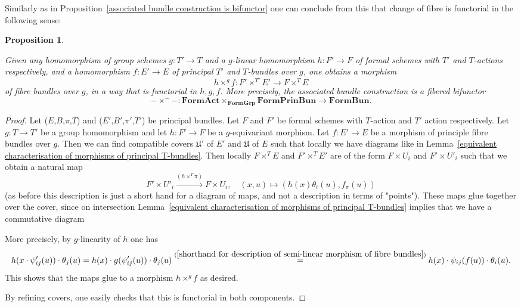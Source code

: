 \documentclass[11pt,oneside]{amsart}
\newtheorem{proposition}[theorem]{Proposition}
\theoremstyle{definition}
\theoremstyle{remark}
\begin{document}
	
	Similarly as in Proposition~\ref{associated bundle construction is bifunctor} one can conclude from this that change of fibre is functorial in the following sense:
	
	\begin{proposition}\label{associated bundle construction in the semi-linear case is a sort of fibered bifunctor}
		
		Given any homomorphism of group schemes $g:T'\rightarrow T$ and a $g$-linear homomorphism $h:F'\rightarrow F$ of formal schemes with $T'$ and $T$-actions respectively, and a homomorphism $f:E'\rightarrow E$ of principal $T'$ and $T$-bundles over $g$, one obtains a morphism
		\[h\times^g f : F'\times^{T'}E'\rightarrow F\times^T E\]
		of fibre bundles over $g$, in a way that is functorial in $h,g,f$. 
		More precisely, the associated bundle construction is a fibered bifunctor
		\[-\times^{-}-: \mathbf{FormAct} \times_{\mathbf{FormGrp}} \mathbf{FormPrinBun}\rightarrow \mathbf{FormBun}. \]
	\end{proposition}
	\begin{proof}
		Let ($E$,$B$,$\pi$,$T$) and ($E'$,$B'$,$\pi'$,$T'$) be principal bundles. Let $F$ and $F'$ be formal schemes with $T$-action and $T'$ action respectively. Let $g:T\rightarrow T'$ be a group homomorphism and let $h:F'\rightarrow F$ be a $g$-equivariant morphism.
		Let $f:E'\rightarrow E$ be a morphism of principle fibre bundles over $g$.
		Then we can find compatible covers $\mathfrak U'$ of $E'$ and $\mathfrak U$ of $E$ such that locally we have diagrams like in Lemma~\ref{equivalent characterisation of morphisms of principal T-bundles}. Then locally $F\times^T E$ and $F'\times^T E'$ are of the form $F\times U_i$ and $F'\times U'_i$ such that we obtain a natural map
		\[F'\times U'_i\xrightarrow{(h\times^T\pi)} F\times U_i, \quad (x,u)\mapsto (h(x)\theta_i(u),f_\pi(u))\]
		(as before this description is just a short hand for a diagram of maps, and not a description in terms of "points"). These maps glue together over the cover, since on intersection Lemma~\ref{equivalent characterisation of morphisms of principal T-bundles} implies that we have a commutative diagram
		\begin{center}
		\end{center}
		More precisely, by $g$-linearity of $h$ one has
		\[h(x\cdot\psi_{ij}'(u))\cdot \theta_j(u)  =  h(x)\cdot g(\psi_{ij}'(u))\cdot \theta_j(u)  \stackrel{(\ref{shorthand for description of semi-linear morphism of fibre  bundles})}{=} h(x)\cdot \psi_{ij}(f(u))\cdot \theta_i(u).\]
		This shows that the maps glue to a morphism $h\times^g f$ as desired.
		
		By refining covers, one easily checks that this is functorial in both components.
	\end{proof}
\end{document}
